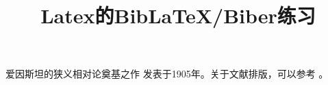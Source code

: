 \documentclass[UTF8]{article}
\title{Latex的BibLaTeX/Biber练习}
\begin{document}
爱因斯坦的狭义相对论奠基之作 \cite{einstein1905} 发表于1905年。关于文献排版，可以参考 \cite{lamport94}。

\printbibliography
\end{document}
